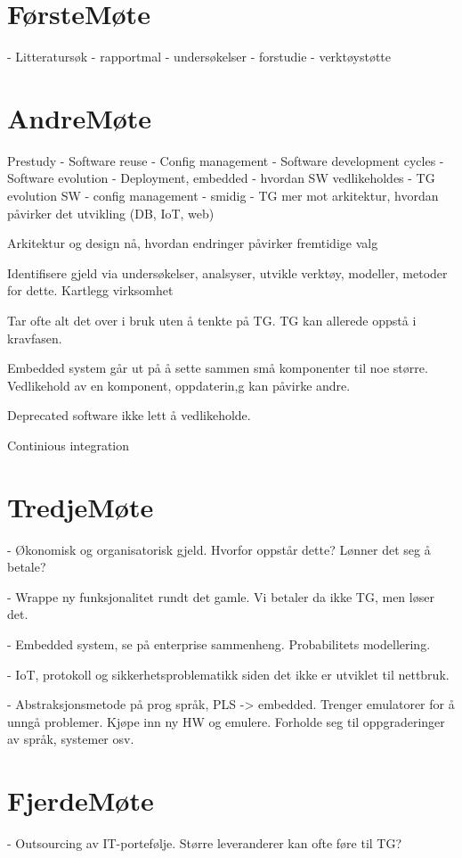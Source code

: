 \section{FørsteMøte}
- Litteratursøk
- rapportmal
- undersøkelser
- forstudie
- verktøystøtte




\section{AndreMøte}
Prestudy
- Software reuse
- Config management
- Software development cycles
- Software evolution
- Deployment, embedded
- hvordan SW vedlikeholdes
- TG evolution SW
- config management
- smidig
- TG mer mot arkitektur, hvordan påvirker det utvikling (DB, IoT, web)

Arkitektur og design nå, hvordan endringer påvirker fremtidige valg

Identifisere gjeld via undersøkelser, analsyser, utvikle verktøy, modeller, metoder for dette. Kartlegg virksomhet

Tar ofte alt det over i bruk uten å tenkte på TG. TG kan allerede oppstå i kravfasen. 

Embedded system går ut på å sette sammen små komponenter til noe større. Vedlikehold av en komponent, oppdaterin,g kan påvirke andre.

Deprecated software ikke lett å vedlikeholde. 

Continious integration


\section{TredjeMøte}
- Økonomisk og organisatorisk gjeld. Hvorfor oppstår dette? Lønner det seg å betale?

- Wrappe ny funksjonalitet rundt det gamle. Vi betaler da ikke TG, men løser det.

- Embedded system, se på enterprise sammenheng. Probabilitets modellering.

- IoT, protokoll og sikkerhetsproblematikk siden det ikke er utviklet til nettbruk.

- Abstraksjonsmetode på prog språk, PLS -> embedded. Trenger emulatorer for å unngå problemer. Kjøpe inn ny HW og emulere. Forholde seg til oppgraderinger av språk, systemer osv.


\section{FjerdeMøte}
- Outsourcing av IT-portefølje. Større leveranderer kan ofte føre til TG?

